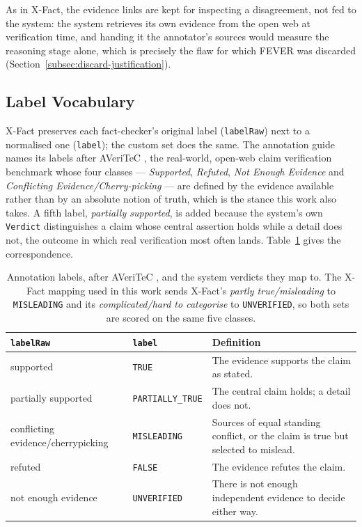 As in X-Fact, the evidence links are kept for inspecting a
disagreement, not fed to the system: the system retrieves its own
evidence from the open web at verification time, and handing it the
annotator's sources would measure the reasoning stage alone, which is
precisely the flaw for which FEVER was discarded
(Section~\ref{subsec:discard-justification}).

\subsection{Label Vocabulary}
\label{subsec:custom-labels}

X-Fact preserves each fact-checker's original label
(\texttt{labelRaw}) next to a normalised one (\texttt{label}); the
custom set does the same. The annotation guide names its labels after
AVeriTeC \cite{schlichtkrull2023averitec}, the real-world,
open-web claim verification benchmark whose four classes ---
\emph{Supported}, \emph{Refuted}, \emph{Not Enough Evidence} and
\emph{Conflicting Evidence/Cherry-picking} --- are defined by the
evidence available rather than by an absolute notion of truth, which
is the stance this work also takes. A fifth label,
\emph{partially supported}, is added because the system's own
\texttt{Verdict} distinguishes a claim whose central assertion holds
while a detail does not, the outcome in which real verification most
often lands. Table~\ref{tab:custom-labels} gives the correspondence.

\begin{table}[ht]
\centering
\small
\begin{tabularx}{\linewidth}{@{}llX@{}}
\toprule
\textbf{\texttt{labelRaw}} & \textbf{\texttt{label}} &
\textbf{Definition} \\
\midrule
supported & \texttt{TRUE} & The evidence supports the claim as
stated. \\
partially supported & \texttt{PARTIALLY\_TRUE} & The central claim
holds; a detail does not. \\
conflicting evidence/cherrypicking & \texttt{MISLEADING} & Sources
of equal standing conflict, or the claim is true but selected to
mislead. \\
refuted & \texttt{FALSE} & The evidence refutes the claim. \\
not enough evidence & \texttt{UNVERIFIED} & There is not enough
independent evidence to decide either way. \\
\bottomrule
\end{tabularx}
\caption{Annotation labels, after AVeriTeC
\cite{schlichtkrull2023averitec}, and the system verdicts they map
to. The X-Fact mapping used in this work sends X-Fact's
\emph{partly true/misleading} to \texttt{MISLEADING} and its
\emph{complicated/hard to categorise} to \texttt{UNVERIFIED}, so both
sets are scored on the same five classes.}
\label{tab:custom-labels}
\end{table}

